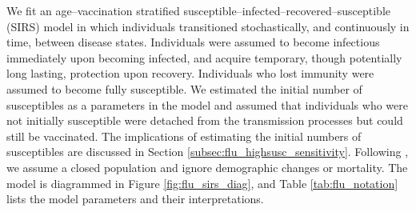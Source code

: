 We fit an age--vaccination stratified susceptible--infected--recovered--susceptible (SIRS) model in which individuals transitioned stochastically, and continuously in time, between disease states. Individuals were assumed to become infectious immediately upon becoming infected, and acquire temporary, though potentially long lasting, protection upon recovery. Individuals who lost immunity were assumed to become fully susceptible. We estimated the initial number of susceptibles as a parameters in the model and assumed that individuals who were not initially susceptible were detached from the transmission processes but could still be vaccinated. The implications of estimating the initial numbers of susceptibles are discussed in Section \ref{subsec:flu_highsusc_sensitivity}. Following \cite{shubin2016revealing}, we assume a closed population and ignore demographic changes or mortality. The model is diagrammed in Figure \ref{fig:flu_sirs_diag}, and Table \ref{tab:flu_notation} lists the model parameters and their interpretations. 

